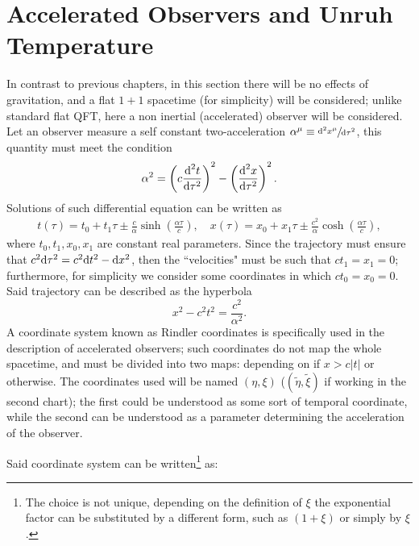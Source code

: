 \section{Accelerated Observers and Unruh Temperature}
In contrast to previous chapters, in this section there will be no effects of gravitation, and a flat $1+1$ spacetime (for simplicity) will be considered; unlike standard flat QFT, here a non inertial (accelerated) observer will be considered. Let an observer measure a self constant two-acceleration $\alpha^\mu\equiv \sfrac{\text{d}^2 x^\mu}{\text{d}\tau^2}$, this quantity must meet the condition
\begin{equation}
	\alpha^2=\left(c\frac{\text{d}^2 t}{\text{d}\tau^2}\right)^2-\left(\frac{\text{d}^2x}{\text{d}\tau^2}\right)^2.
\end{equation}
Solutions of such differential equation can be written as
\begin{subequations}
	\begin{gather}
		t(\tau)=t_0+t_1\tau\pm\frac{c}{\alpha}\sinh\left(\frac{\alpha\tau}{c}\right),\quad x(\tau)=x_0+x_1\tau\pm\frac{c^2}{\alpha}\cosh\left(\frac{\alpha\tau}{c}\right),\tag{\theequation \,\,a,b}
	\end{gather}
\end{subequations}
where $t_0,t_1,x_0,x_1$ are constant real parameters. Since the trajectory must ensure that $c^2\text{d}\tau^2=c^2\text{d} t^2-\text{d} x^2$, then the ``velocities" must be such that $ct_1=x_1=0$; furthermore, for simplicity we consider some coordinates in which $ct_0=x_0=0$. Said trajectory can be described as the hyperbola
\begin{equation}
	x^2-c^2t^2=\frac{c^2}{\alpha^2}.
\end{equation}
A coordinate system known as Rindler coordinates is specifically used in the description of accelerated observers; such coordinates do not map the whole spacetime, and must be divided into two maps: depending on if $x>c|t|$ or otherwise. The coordinates used will be named $(\eta,\xi)$ ($(\tilde\eta,\tilde\xi)$ if working in the second chart); the first could be understood as some sort of temporal coordinate,  while the second can be understood as a parameter determining the acceleration of the observer.
\begin{wrapfigure}[13]{r}{0.49\textwidth}
\end{wrapfigure}
Said coordinate system can be written\footnote{The choice is not unique, depending on the definition of $\xi$ the exponential factor can be substituted by a different form, such as $(1+\xi)$ or simply by $\xi$.} as:

